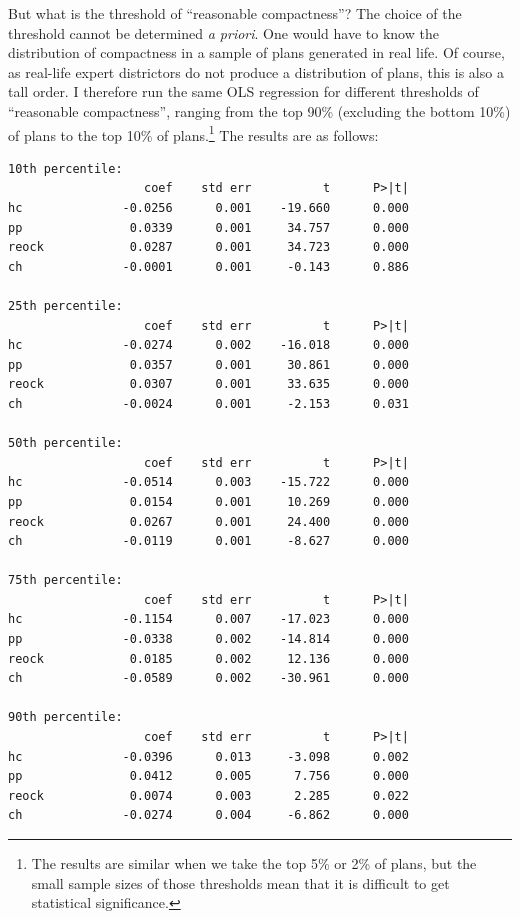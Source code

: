 \documentclass[]{article}
\begin{document}
But what is the threshold of ``reasonable compactness''? The choice of
the threshold cannot be determined \emph{a priori}. One would have to
know the distribution of compactness in a sample of plans generated in
real life. Of course, as real-life expert districtors do not produce a
distribution of plans, this is also a tall order. I therefore run the
same OLS regression for different thresholds of ``reasonable
compactness'', ranging from the top 90\% (excluding the bottom 10\%) of
plans to the top 10\% of plans.\footnote{The results are similar when we
  take the top 5\% or 2\% of plans, but the small sample sizes of those
  thresholds mean that it is difficult to get statistical significance.}
The results are as follows:

\begin{verbatim}
10th percentile:
                   coef    std err          t      P>|t|
hc              -0.0256      0.001    -19.660      0.000
pp               0.0339      0.001     34.757      0.000
reock            0.0287      0.001     34.723      0.000
ch              -0.0001      0.001     -0.143      0.886

25th percentile:
                   coef    std err          t      P>|t|
hc              -0.0274      0.002    -16.018      0.000
pp               0.0357      0.001     30.861      0.000
reock            0.0307      0.001     33.635      0.000
ch              -0.0024      0.001     -2.153      0.031

50th percentile:
                   coef    std err          t      P>|t|
hc              -0.0514      0.003    -15.722      0.000
pp               0.0154      0.001     10.269      0.000
reock            0.0267      0.001     24.400      0.000
ch              -0.0119      0.001     -8.627      0.000

75th percentile:
                   coef    std err          t      P>|t|
hc              -0.1154      0.007    -17.023      0.000
pp              -0.0338      0.002    -14.814      0.000
reock            0.0185      0.002     12.136      0.000
ch              -0.0589      0.002    -30.961      0.000

90th percentile:
                   coef    std err          t      P>|t|
hc              -0.0396      0.013     -3.098      0.002
pp               0.0412      0.005      7.756      0.000
reock            0.0074      0.003      2.285      0.022
ch              -0.0274      0.004     -6.862      0.000
\end{verbatim}
\end{document}
